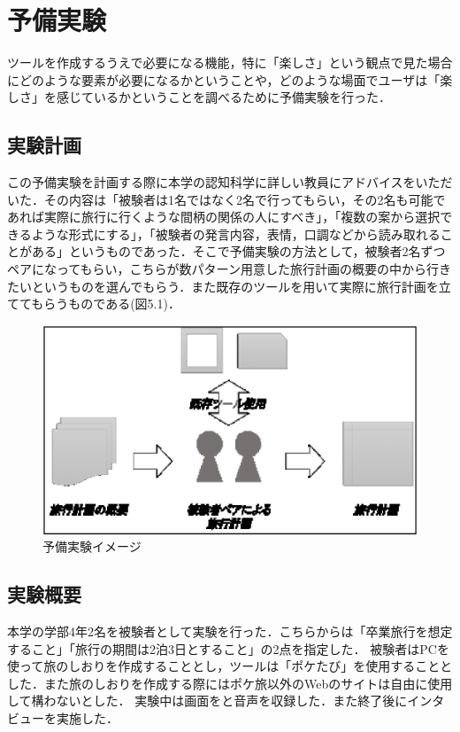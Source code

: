 \documentclass{funthesis}
\begin{document}
\chapter{予備実験}%
ツールを作成するうえで必要になる機能，特に「楽しさ」という観点で見た場合にどのような要素が必要になるかということや，どのような場面でユーザは「楽しさ」を感じているかということを調べるために予備実験を行った．

\section{実験計画}
この予備実験を計画する際に本学の認知科学に詳しい教員にアドバイスをいただいた．その内容は「被験者は1名ではなく2名で行ってもらい，その2名も可能であれば実際に旅行に行くような間柄の関係の人にすべき」，「複数の案から選択できるような形式にする」，「被験者の発言内容，表情，口調などから読み取れることがある」というものであった．そこで予備実験の方法として，被験者2名ずつペアになってもらい，こちらが数パターン用意した旅行計画の概要の中から行きたいというものを選んでもらう．また既存のツールを用いて実際に旅行計画を立ててもらうものである(図5.1)．
\begin{figure}[htpb]
\begin{center}
\includegraphics[scale=0.65]{semiexp.eps}
\caption{予備実験イメージ}
\end{center}
\end{figure}


\section{実験概要}
本学の学部4年2名を被験者として実験を行った．こちらからは「卒業旅行を想定すること」「旅行の期間は2泊3日とすること」の2点を指定した．
被験者はPCを使って旅のしおりを作成することとし，ツールは「ポケたび」を使用することとした．また旅のしおりを作成する際にはポケ旅以外のWebのサイトは自由に使用して構わないとした．
実験中は画面をと音声を収録した．また終了後にインタビューを実施した．
\end{document}
